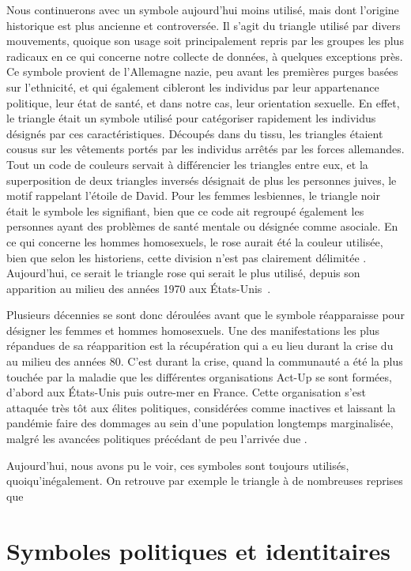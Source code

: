 Nous continuerons avec un symbole aujourd'hui moins utilisé, mais dont l'origine historique est plus ancienne et controversée.
Il s'agit du triangle utilisé par divers mouvements, quoique son usage soit principalement repris par les groupes les plus radicaux en ce qui concerne notre collecte de données, à quelques exceptions près.
Ce symbole provient de l'Allemagne nazie, peu avant les premières purges basées sur l'ethnicité, et qui également cibleront les individus par leur appartenance politique, leur état de santé, et dans notre cas, leur orientation sexuelle.
En effet, le triangle était un symbole utilisé pour catégoriser rapidement les individus désignés par ces caractéristiques.
Découpés dans du tissu, les triangles étaient cousus sur les vêtements portés par les individus arrêtés par les forces allemandes.
Tout un code de couleurs servait à différencier les triangles entre eux, et la superposition de deux triangles inversés désignait de plus les personnes juives, le motif rappelant l'étoile de David.
Pour les femmes lesbiennes, le triangle noir était le symbole les signifiant, bien que ce code ait regroupé également les personnes ayant des problèmes de santé mentale ou désignée comme asociale.
En ce qui concerne les hommes homosexuels, le rose aurait été la couleur utilisée, bien que selon les historiens, cette division n'est pas clairement délimitée \citep[334]{Jensen2002}.
Aujourd'hui, ce serait le triangle rose qui serait le plus utilisé, depuis son apparition au milieu des années 1970 aux États-Unis~\citep[328]{Jensen2002}.

Plusieurs décennies se sont donc déroulées avant que le symbole réapparaisse pour désigner les femmes et hommes homosexuels.
Une des manifestations les plus répandues de sa réapparition est la récupération qui a eu lieu durant la crise du \vih{} au milieu des années 80.
C'est durant la crise, quand la communauté \lgbt{} a été la plus touchée par la maladie que les différentes organisations Act-Up se sont formées, d'abord aux États-Unis puis outre-mer en France.
Cette organisation s'est attaquée très tôt aux élites politiques, considérées comme inactives et laissant la pandémie faire des dommages au sein d'une population longtemps marginalisée, malgré les avancées politiques précédant de peu l'arrivée due \vih{}.

Aujourd'hui, nous avons pu le voir, ces symboles sont toujours utilisés, quoiqu’inégalement.
On retrouve par exemple le triangle à de nombreuses reprises que

\section{Symboles politiques et identitaires}
\label{sec:symboles_politiques_et_identitaire}

